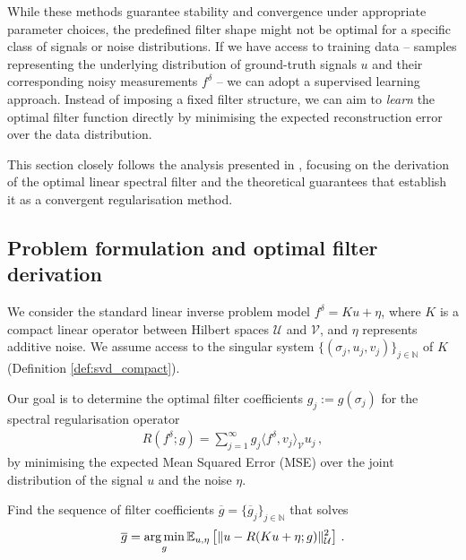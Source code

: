 While these methods guarantee stability and convergence under appropriate parameter choices, the predefined filter shape might not be optimal for a specific class of signals or noise distributions. If we have access to training data -- samples representing the underlying distribution of ground-truth signals $u$ and their corresponding noisy measurements $f^\delta$ -- we can adopt a supervised learning approach. Instead of imposing a fixed filter structure, we can aim to \emph{learn} the optimal filter function directly by minimising the expected reconstruction error over the data distribution.

This section closely follows the analysis presented in \cite{kabri_convergent_2024}, focusing on the derivation of the optimal linear spectral filter and the theoretical guarantees that establish it as a convergent regularisation method.

\subsection{Problem formulation and optimal filter derivation}

We consider the standard linear inverse problem model $f^\delta = K u + \eta$, where $K$ is a compact linear operator between Hilbert spaces $\mathcal{U}$ and $\mathcal{V}$, and $\eta$ represents additive noise. We assume access to the singular system $\{ (\sigma_j, u_j, v_j) \}_{j \in \mathbb{N}}$ of $K$ (Definition \ref{def:svd_compact}).

Our goal is to determine the optimal filter coefficients $g_j := g(\sigma_j)$ for the spectral regularisation operator
\begin{align}
R(f^\delta; g) = \sum_{j=1}^\infty g_j \langle f^\delta, v_j \rangle_{\mathcal{V}} u_j \, , \label{eq:data_driven_spectral_op}
\end{align}
by minimising the expected Mean Squared Error (MSE) over the joint distribution of the signal $u$ and the noise $\eta$.

\begin{prob}\label{prob:optimal_filter}\normalfont
Find the sequence of filter coefficients $\overline{g} = \{ \overline{g}_j \}_{j \in \mathbb{N}}$ that solves
\begin{align}
\overline{g} = \operatorname*{arg\,min}_{g} \mathbb{E}_{u,\eta} \left[ \| u - R(K u + \eta; g) \|_{\mathcal{U}}^2 \right] \, . \label{eq:optimal_filter_objective}
\end{align}
\end{prob}

